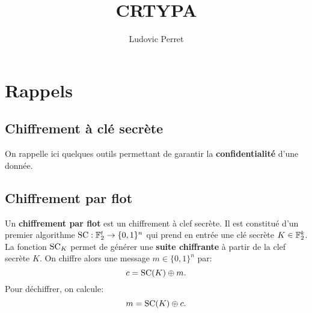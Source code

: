 \documentclass{llncs}[11pt]
\begin{document}
\pagestyle{headings}{\mainmatter}


\title{CRTYPA}

\author{Ludovic Perret}




\maketitle

\begin{abstract}

\end{abstract}

\section{Rappels}

\subsection{Chiffrement  à clé secrète}
On rappelle ici quelques outils permettant de garantir la {\bf confidentialité} d'une donnée. 
\subsection{Chiffrement  par flot}
\begin{definition}
Un {\bf chiffrement par flot} est un chiffrement à clef secrète. Il est constitué d'un premier algorithme ${\rm SC} : \mathbb{F}_2^t \to  \{0,1\}^n$ qui prend en entrée une clé secrète $K \in \mathbb{F}_2^k$.  La fonction ${\rm SC}_K$ permet de générer une {\bf  suite chiffrante} à partir de la clef secrète $K$.  
On chiffre alors une message $m \in \{0,1\}^n$ par:   
$$
c={\rm SC}(K)  \oplus m.      
$$ 
Pour déchiffrer, on calcule: 
$$
m={\rm SC}(K)  \oplus c.      
$$ 
\end{definition}
\end{document}
